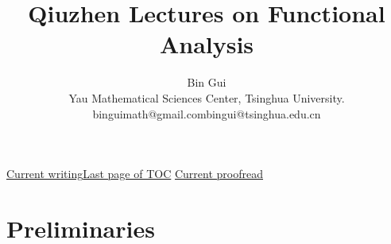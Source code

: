 \documentclass[12pt,b5paper,notitlepage]{article}
\title{Qiuzhen Lectures on Functional Analysis}
\author{{\sc Bin Gui}
	\\
	{\small \sc Yau Mathematical Sciences Center, Tsinghua University.}\\
	{\small binguimath@gmail.com\qquad bingui@tsinghua.edu.cn}
}
\theoremstyle{definition}
\theoremstyle{plain}
\numberwithin{equation}{section}
\begin{document}
\sloppy %
	\setcounter{page}{1}



	









	
	\maketitle
\small   
\qquad 

\hyperlink{current}{Current writing}\qquad \hyperlink{page.3}{Last page of TOC}\qquad
\hyperlink{proofread}{Current proofread}











	


\normalsize
\tableofcontents






\newpage



\section{Preliminaries}
\end{document}
